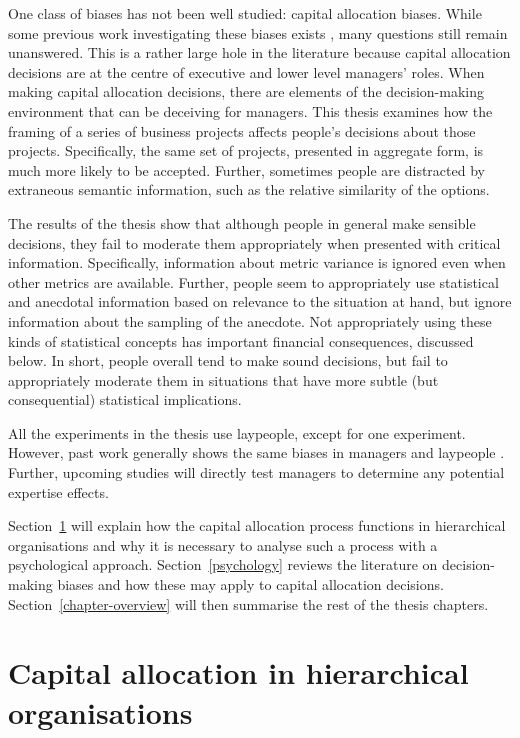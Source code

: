 \documentclass[a4paper, nobind, dvipsnames]{templates/ociamthesis}
\theoremstyle{definition}
\theoremstyle{definition}
\theoremstyle{definition}
\theoremstyle{definition}
\theoremstyle{remark}
\begin{document}
One class of biases has not been well studied: capital allocation biases. While
some previous work investigating these biases exists \autocite[e.g.,][]{bardolet2011}, many
questions still remain unanswered. This is a rather large hole in the literature
because capital allocation decisions are at the centre of executive and lower
level managers' roles. When making capital allocation decisions, there are
elements of the decision-making environment that can be deceiving for managers.
This thesis examines how the framing of a series of business projects affects
people's decisions about those projects. Specifically, the same set of projects,
presented in aggregate form, is much more likely to be accepted. Further,
sometimes people are distracted by extraneous semantic information, such as the
relative similarity of the options.

The results of the thesis show that although people in general make sensible
decisions, they fail to moderate them appropriately when presented with critical
information. Specifically, information about metric variance is ignored even
when other metrics are available. Further, people seem to appropriately use
statistical and anecdotal information based on relevance to the situation at
hand, but ignore information about the sampling of the anecdote. Not
appropriately using these kinds of statistical concepts has important
financial consequences, discussed below. In short, people overall tend to make
sound decisions, but fail to appropriately moderate them in situations that have
more subtle (but consequential) statistical implications.

All the experiments in the thesis use laypeople, except for one experiment.
However, past work generally shows the same biases in managers and laypeople
\autocite[with some showing more bias, e.g.,][]{haigh2005}. Further, upcoming studies will
directly test managers to determine any potential expertise effects.

Section~\ref{capital-allocation} will explain how the capital allocation
process functions in hierarchical organisations and why it is necessary to
analyse such a process with a psychological approach. Section~\ref{psychology}
reviews the literature on decision-making biases and how these may apply to
capital allocation decisions. Section~\ref{chapter-overview} will then
summarise the rest of the thesis chapters.

\hypertarget{capital-allocation}{%
\section{Capital allocation in hierarchical organisations}\label{capital-allocation}}
\end{document}
